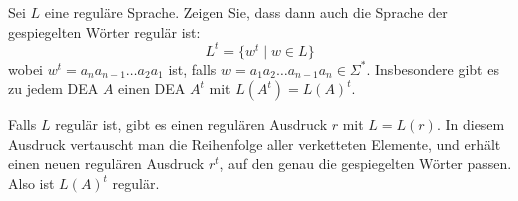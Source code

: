 Sei $L$ eine reguläre Sprache. Zeigen Sie, dass dann auch die Sprache
der gespiegelten Wörter regulär ist:
\[
L^t
=
\{
w^t\;|\;w\in L
\}
\]
wobei $w^t=a_na_{n-1}\dots a_2a_1$ ist, falls
$w=a_1a_2\dots a_{n-1}a_n\in\Sigma^*$. Insbesondere gibt es zu jedem DEA $A$
einen DEA $A^t$ mit $L(A^t)=L(A)^t$.

\begin{loesung}
Falls $L$ regulär ist, gibt es einen regulären Ausdruck $r$
mit $L=L(r)$. In diesem Ausdruck vertauscht man die Reihenfolge aller
verketteten Elemente, und erhält einen neuen regulären Ausdruck
$r^t$, auf den genau die gespiegelten Wörter passen.
Also ist $L(A)^t$ regulär.
\end{loesung}
